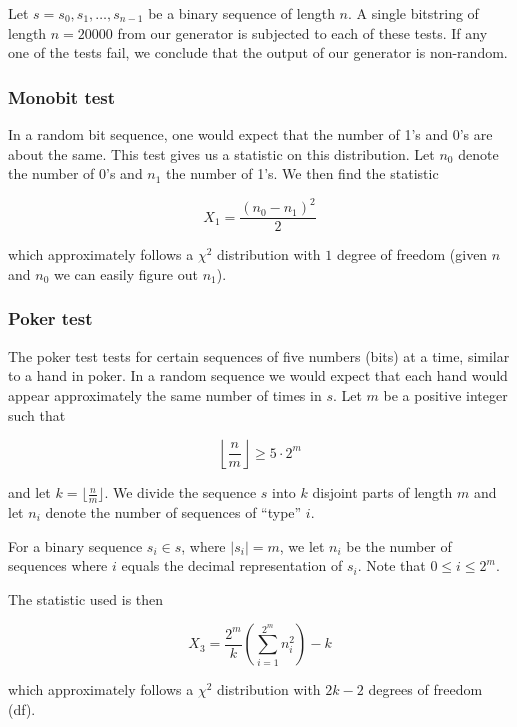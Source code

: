 \documentclass[a4paper]{article}           %
\begin{document}
Let $s = s_0, s_1, \ldots, s_{n-1}$ be a binary sequence of length $n$. A single bitstring of length $n = 20000$ from our generator is subjected to each of these tests. If any one of the tests fail, we conclude that the output of our generator is non-random. 

\subsubsection{Monobit test}

In a random bit sequence, one would expect that the number of 1's and 0's are about the same. This test gives us a statistic on this distribution. Let $n_0$ denote the number of 0's and $n_1$ the number of 1's. We then find the statistic

\begin{equation}
X_1 = \frac{(n_0 - n_1)^2}{2}
\end{equation}

which approximately follows a $\chi^2$ distribution with $1$ degree of freedom (given $n$ and $n_0$ we can easily figure out $n_1$). 

\subsubsection{Poker test}

The poker test tests for certain sequences of five numbers (bits) at a time, similar to a hand in poker. In a random sequence we would expect that each hand would appear approximately the same number of times in $s$. Let $m$ be a positive integer such that 

\[
\displaystyle \left \lfloor \frac nm \right \rfloor \geq 5 \cdot 2^m
\]

and let $k = \lfloor \frac n m \rfloor$. We divide the sequence $s$ into $k$ disjoint parts of length $m$ and let $n_i$ denote the number of sequences of ``type'' $i$.

For a binary sequence $s_i \in s$, where $|s_i| = m$, we let $n_i$ be the number of sequences where $i$ equals the decimal representation of $s_i$. Note that $0 \leq i \leq 2^m$. 

The statistic used is then

\begin{equation}
X_3 = \frac{2^m}{k} \left( \sum_{i=1}^{2^m} n_i^2 \right) - k
\end{equation}

which approximately follows a $\chi^2$ distribution with $2k - 2$ degrees of freedom (df).
 
\end{document}
